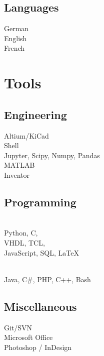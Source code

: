 \documentclass[]{resume}
\begin{document}
\begin{facts}
\subsection{Languages}
German \\
English \\
French  
\sectionsep

\section{Tools}

\subsection{Engineering}
Altium/KiCad\\
Shell\\
Jupyter, Scipy, Numpy, Pandas\\
MATLAB\\
Inventor
\sectionsep

\subsection{Programming}
\\
Python, C,\\
VHDL, TCL,\\
JavaScript, SQL, LaTeX
\sectionsep

\\
Java, C\#, PHP, C++, Bash
\sectionsep

\subsection{Miscellaneous}
Git/SVN\\
Microsoft Office\\
Photoshop / InDesign
\sectionsep

\end{facts}
\end{document}

